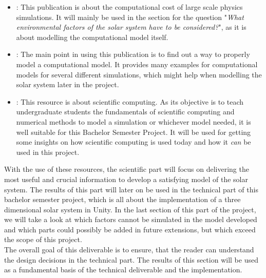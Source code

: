 \documentclass[conference,compsoc]{IEEEtran}
\begin{document}
\begin{itemize}
	\item \cite{PhysicsSimulationsLargeWorlds}: This publication is about the computational cost of large scale physics simulations. It will mainly be used in the section for the question "\emph{What environmental factors of the solar system have to be considered?}", as it is about modelling the computational model itself. 
	\item \cite{ComputationalModelling}: The main point in using this publication is to find out a way to properly model a computational model. It provides many examples for computational models for several different simulations, which might help when modelling the solar system later in the project.
	\item \cite{ScientificComputing}: This resource is about scientific computing. As its objective is to teach undergraduate students the fundamentals of scientific computing and numerical methods to model a simulation or whichever model needed, it is well suitable for this Bachelor Semester Project. It will be used for getting some insights on how scientific computing is used today and how it \emph{can} be used in this project.
\end{itemize}
With the use of these resources, the scientific part will focus on delivering the most useful and crucial information to develop a satisfying model of the solar system. The results of this part will later on be used in the technical part of this bachelor semester project, which is all about the implementation of a three dimensional solar system in Unity. In the last section of this part of the project, we will take a look at which factors cannot be simulated in the model developed and which parts could possibly be added in future extensions, but which exceed the scope of this project. \\
The overall goal of this deliverable is to ensure, that the reader can understand the design decisions in the technical part. The results of this section will be used as a fundamental basis of the technical deliverable and the implementation.
\end{document}
